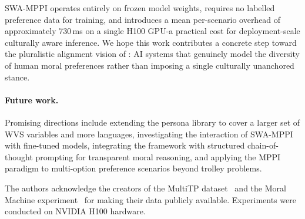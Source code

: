 \documentclass{article}
\begin{document}
SWA-MPPI operates entirely on frozen model weights, requires no labelled preference
data for training, and introduces a mean per-scenario overhead of approximately
730\,ms on a single H100 GPU-a practical cost for deployment-scale culturally
aware inference. We hope this work contributes a concrete step toward the pluralistic
alignment vision of \citet{sorensen2024roadmap}: AI systems that genuinely model
the diversity of human moral preferences rather than imposing a single culturally
unanchored stance.

\paragraph{Future work.}
Promising directions include extending the persona library to cover a larger set
of WVS variables and more languages, investigating the interaction of SWA-MPPI
with fine-tuned models, integrating the framework with structured chain-of-thought
prompting for transparent moral reasoning, and applying the MPPI paradigm to
multi-option preference scenarios beyond trolley problems.

\begin{ack}
The authors acknowledge the creators of the MultiTP dataset~\citep{jin2025multitp}
and the Moral Machine experiment~\citep{awad2018moral} for making their data
publicly available. Experiments were conducted on NVIDIA H100 hardware.
\end{ack}



\end{document}

